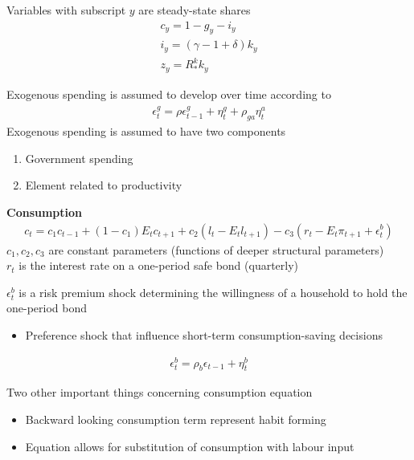 \documentclass{beamer}
\begin{document}
\begin{frame}
  Variables with subscript $y$ are steady-state shares
  \begin{align}
    c_y=1-g_y-i_y\\
    i_y=(\gamma-1+\delta)k_y\\
    z_y=R^k_*k_y
  \end{align}  
\end{frame}

\begin{frame}  
Exogenous spending is assumed to develop over time according to
\begin{align}
  \epsilon_t^g = \rho\epsilon_{t-1}^g + \eta_t^g + \rho_{ga}\eta_t^a
\end{align}
Exogenous spending is assumed to have two components
\begin{enumerate}
  \item Government spending
  \item Element related to productivity
\end{enumerate} 
\end{frame}

\begin{frame}
  \textbf{Consumption}  
\begin{align}
  c_t = c_1c_{t-1} + (1-c_1) E_t c_{t+1} + c_2(l_t-E_t l_{t+1}) - c_3(r_t - E_t \pi_{t+1} + \epsilon_t^b)
\end{align}
$c_1, c_2, c_3$ are constant parameters (functions of deeper structural parameters)\\
$r_t$ is the interest rate on a one-period safe bond (quarterly)\\ \medskip

$\epsilon_t^b$ is a risk premium shock determining the willingness of a household to hold the one-period bond
\begin{itemize}
  \item Preference shock that influence short-term consumption-saving decisions
\end{itemize}
\begin{align}
  \epsilon_t^b = \rho_b\epsilon_{t-1} + \eta_t^b
\end{align}
\end{frame}

\begin{frame}
  Two other important things concerning consumption equation
\begin{itemize}
  \item Backward looking consumption term represent habit forming
  \item Equation allows for substitution of consumption with labour input
\end{itemize}

\end{frame}
\end{document}
